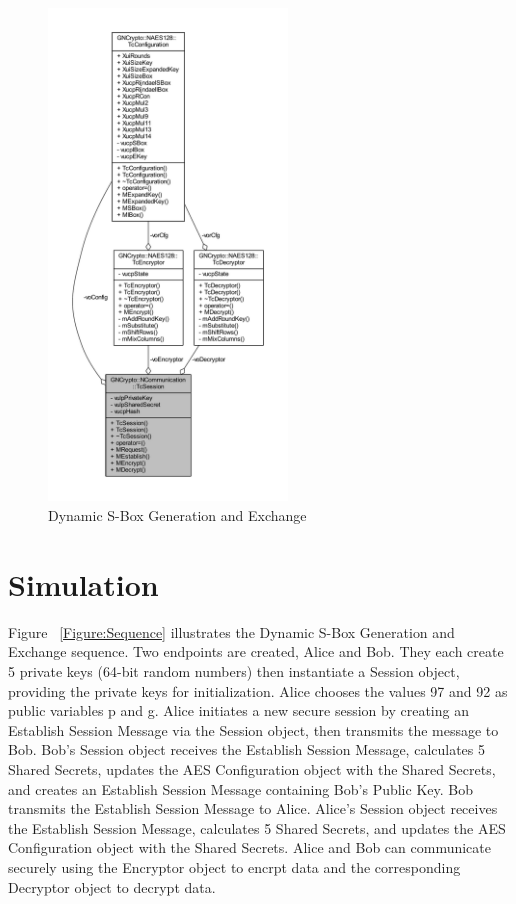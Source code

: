 \documentclass[journal]{IEEEtran}
\begin{document}
\begin{figure}[!t]
	\centering
	\includegraphics[width=2.5in]{CollaborationSession}
	\caption{Dynamic S-Box Generation and Exchange}
	\label{Figure:CollaborationSession}
\end{figure}

\section{Simulation}
Figure ~\ref{Figure:Sequence} illustrates the Dynamic S-Box Generation and Exchange sequence. Two endpoints are created, Alice and Bob. They each create 5 private keys (64-bit random numbers) then instantiate a Session object, providing the private keys for initialization. Alice chooses the values 97 and 92 as public variables p and g. Alice initiates a new secure session by creating an Establish Session Message via the Session object, then transmits the message to Bob. Bob's Session object receives the Establish Session Message, calculates 5 Shared Secrets, updates the AES Configuration object with the Shared Secrets, and creates an Establish Session Message containing Bob's Public Key. Bob transmits the Establish Session Message to Alice. Alice's Session object receives the Establish Session Message, calculates 5 Shared Secrets, and updates the AES Configuration object with the Shared Secrets. Alice and Bob can communicate securely using the Encryptor object to encrpt data and the corresponding Decryptor object to decrypt data.
\end{document}
